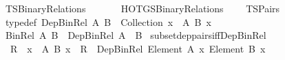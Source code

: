 %
\begin{isabellebody}%
%
%
\isadelimdocument
%
\endisadelimdocument
%
\isatagdocument
\isanewline
%
\isamarkuptrue%
%
\endisatagdocument
{\isafolddocument}%
%
\isadelimdocument
%
\endisadelimdocument
%
\isadelimtheory
%
\endisadelimtheory
%
\isatagtheory
{}\isamarkupfalse%
\ TSBinary{\isacharunderscore}{\kern0pt}Relations\isanewline
\ \ \isanewline
\ \ \ \ HOTG{\isachardot}{\kern0pt}SBinary{\isacharunderscore}{\kern0pt}Relations\isanewline
\ \ \ \ TSPairs\isanewline
{}%
\endisatagtheory
{\isafoldtheory}%
%
\isadelimtheory
%
\endisadelimtheory
%
\isadelimdocument
%
\endisadelimdocument
%
\isatagdocument
%
\isamarkuptrue%
%
\endisatagdocument
{\isafolddocument}%
%
\isadelimdocument
%
\endisadelimdocument
{}\isamarkupfalse%
\ {\isacharbrackleft}{\kern0pt}typedef{\isacharbrackright}{\kern0pt}{\isacharcolon}{\kern0pt}\ {\isachardoublequoteopen}Dep{\isacharunderscore}{\kern0pt}Bin{\isacharunderscore}{\kern0pt}Rel\ A\ B\ {\isasymequiv}\ Collection\ {\isacharparenleft}{\kern0pt}{\isasymSum}x\ {\isacharcolon}{\kern0pt}\ A{\isachardot}{\kern0pt}\ {\isacharparenleft}{\kern0pt}B\ x{\isacharparenright}{\kern0pt}{\isacharparenright}{\kern0pt}{\isachardoublequoteclose}\isanewline
\isanewline
{}\isamarkupfalse%
\ {\isachardoublequoteopen}Bin{\isacharunderscore}{\kern0pt}Rel\ A\ B\ {\isasymequiv}\ Dep{\isacharunderscore}{\kern0pt}Bin{\isacharunderscore}{\kern0pt}Rel\ A\ {\isacharparenleft}{\kern0pt}{\isasymlambda}{\isacharunderscore}{\kern0pt}{\isachardot}{\kern0pt}\ B{\isacharparenright}{\kern0pt}{\isachardoublequoteclose}\isanewline
\isanewline
{}\isamarkupfalse%
\ subset{\isacharunderscore}{\kern0pt}dep{\isacharunderscore}{\kern0pt}pairs{\isacharunderscore}{\kern0pt}iff{\isacharunderscore}{\kern0pt}Dep{\isacharunderscore}{\kern0pt}Bin{\isacharunderscore}{\kern0pt}Rel{\isacharcolon}{\kern0pt}\isanewline
\ \ {\isachardoublequoteopen}R\ {\isasymsubseteq}\ {\isacharparenleft}{\kern0pt}{\isasymSum}x\ {\isasymin}\ A{\isachardot}{\kern0pt}\ {\isacharparenleft}{\kern0pt}B\ x{\isacharparenright}{\kern0pt}{\isacharparenright}{\kern0pt}\ {\isasymlongleftrightarrow}\ R\ {\isacharcolon}{\kern0pt}\ Dep{\isacharunderscore}{\kern0pt}Bin{\isacharunderscore}{\kern0pt}Rel\ {\isacharparenleft}{\kern0pt}Element\ A{\isacharparenright}{\kern0pt}\ {\isacharparenleft}{\kern0pt}{\isasymlambda}x{\isachardot}{\kern0pt}\ Element\ {\isacharparenleft}{\kern0pt}B\ x{\isacharparenright}{\kern0pt}{\isacharparenright}{\kern0pt}{\isachardoublequoteclose}\isanewline

\end{isabellebody}
